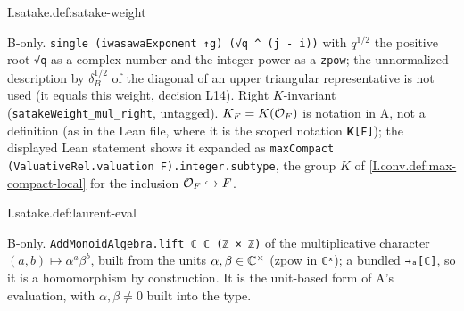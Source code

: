 \begin{definition}
\bonly
{}
\end{definition}
\begin{tfformal}{I.satake.def:satake-weight}
\begin{tffidelity}
B-only. \texttt{single (iwasawaExponent ↑g) (√q \^{} (j - i))} with $q^{1/2}$ the positive root \texttt{√q} as a complex number and the integer power as a \texttt{zpow}; the unnormalized description by $\delta_B^{1/2}$ of the diagonal of an upper triangular representative is not used (it equals this weight, decision L14). Right $K$-invariant (\texttt{satakeWeight\_mul\_right}, untagged). $K_F=K(\mathcal{O}_F)$ is notation in A, not a definition (as in the Lean file, where it is the scoped notation \texttt{𝐊[F]}); the displayed Lean statement shows it expanded as \texttt{maxCompact (ValuativeRel.valuation F).integer.subtype}, the group $K$ of \cref{I.conv.def:max-compact-local} for the inclusion $\mathcal{O}_F\hookrightarrow F$.
\end{tffidelity}
\end{tfformal}

\begin{definition}
\bonly
{}
\end{definition}
\begin{tfformal}{I.satake.def:laurent-eval}
\begin{tffidelity}
B-only. \texttt{AddMonoidAlgebra.lift ℂ ℂ (ℤ × ℤ)} of the multiplicative character $(a,b)\mapsto\alpha^a\beta^b$, built from the units $\alpha,\beta\in\mathbb{C}^\times$ (zpow in \texttt{ℂˣ}); a bundled \texttt{→ₐ[ℂ]}, so it is a homomorphism by construction. It is the unit-based form of A's evaluation, with $\alpha,\beta\ne0$ built into the type.
\end{tffidelity}
\end{tfformal}

